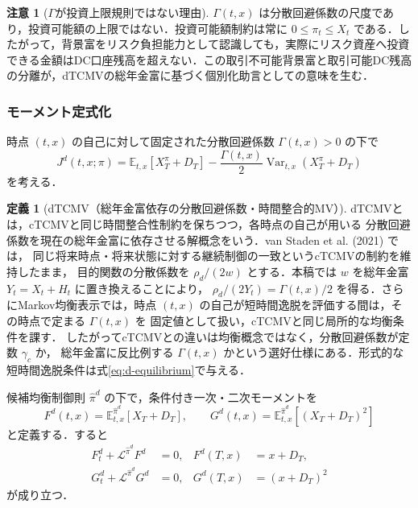 \documentclass[10pt,a4paper]{article}
\theoremstyle{plain}
\theoremstyle{definition}
\newtheorem{definition}{定義}
\newtheorem{remark}{注意}
\newcommand{\E}{\mathbb{E}}
\DeclareMathOperator{\Var}{Var}
\newcommand{\Lop}{\mathcal{L}}
\begin{document}
\begin{remark}[$\Gamma$が投資上限規則ではない理由]
$\Gamma(t,x)$ は分散回避係数の尺度であり，投資可能額の上限ではない．投資可能額制約は常に $0\leq\pi_t\leq X_t$ である．したがって，背景富をリスク負担能力として認識しても，実際にリスク資産へ投資できる金額はDC口座残高を超えない．この取引不可能背景富と取引可能DC残高の分離が，dTCMVの総年金富に基づく個別化助言としての意味を生む．
\end{remark}

\subsubsection{モーメント定式化}

時点 $(t,x)$ の自己に対して固定された分散回避係数 $\Gamma(t,x)>0$ の下で
\begin{equation}
  J^d(t,x;\pi)=\E_{t,x}[X_T^\pi+D_T]
  -\frac{\Gamma(t,x)}{2}\Var_{t,x}(X_T^\pi+D_T)
  \label{eq:d-objective}
\end{equation}
を考える．

\begin{definition}[dTCMV（総年金富依存の分散回避係数・時間整合的MV）]
\label{def:dtcmv}
dTCMVとは，cTCMVと同じ時間整合性制約を保ちつつ，各時点の自己が用いる
分散回避係数を現在の総年金富に依存させる解概念をいう．van Staden et al. (2021) では，
同じ将来時点・将来状態に対する継続制御の一致というcTCMVの制約を維持したまま，
目的関数の分散係数を $\rho_d/(2w)$ とする．本稿では $w$ を総年金富
$Y_t=X_t+H_t$ に置き換えることにより，
$\rho_d/(2Y_t)=\Gamma(t,x)/2$ を得る．さらにMarkov均衡表示では，時点
$(t,x)$ の自己が短時間逸脱を評価する間は，その時点で定まる $\Gamma(t,x)$ を
固定値として扱い，cTCMVと同じ局所的な均衡条件を課す．
したがってcTCMVとの違いは均衡概念ではなく，分散回避係数が定数 $\gamma_c$ か，
総年金富に反比例する $\Gamma(t,x)$ かという選好仕様にある．形式的な
短時間逸脱条件は式\eqref{eq:d-equilibrium}で与える．
\end{definition}

候補均衡制御則 $\hat\pi^d$ の下で，条件付き一次・二次モーメントを
\begin{equation}
  F^d(t,x)=\E_{t,x}^{\hat\pi^d}[X_T+D_T],
  \qquad
  G^d(t,x)=\E_{t,x}^{\hat\pi^d}[(X_T+D_T)^2]
  \label{eq:d-FG}
\end{equation}
と定義する．すると
\begin{align}
  F_t^d+\Lop^{\hat\pi^d}F^d&=0,
  &F^d(T,x)&=x+D_T,
  \label{eq:Fd}\\
  G_t^d+\Lop^{\hat\pi^d}G^d&=0,
  &G^d(T,x)&=(x+D_T)^2
  \label{eq:Gd}
\end{align}
が成り立つ．
\end{document}
